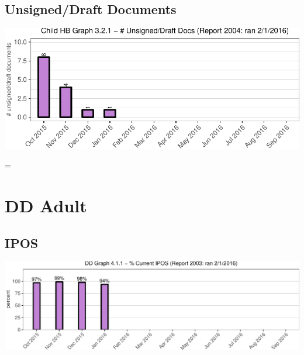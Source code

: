 \documentclass{article}\usepackage[]{graphicx}\usepackage[]{color}
\makeatletter
\def\maxwidth{ %
  \ifdim\Gin@nat@width>\linewidth
    \linewidth
  \else
    \Gin@nat@width
  \fi
}
\newenvironment{knitrout}{}{} %
\newenvironment{absolutelynopagebreak}
  {\par\nobreak\vfil\penalty0\vfilneg
   \vtop\bgroup}
  {\par\xdef\tpd{\the\prevdepth}\egroup
   \prevdepth=\tpd}
\makeatother
\begin{document}
\begin{absolutelynopagebreak}
\subsection{Unsigned/Draft Documents}
\begin{knitrout}
\color{fgcolor}
\includegraphics[width=\maxwidth]{figure/hb_p_unsign-1} 

\end{knitrout}
\end{absolutelynopagebreak}



\pagebreak
\section{DD Adult}
\subsection{IPOS}
\begin{knitrout}
\color{fgcolor}
\includegraphics[width=\maxwidth]{figure/dd_hist-1} 

\end{knitrout}
\end{document}
